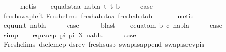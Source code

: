 \begin{isabellebody}
\ \ \ \ \isamarkupfalse%
\ metis\isanewline
{}\isamarkupfalse%
\isanewline
\ \ \isamarkupfalse%
\ {\isacharparenleft}{\kern0pt}equ{\isacharunderscore}{\kern0pt}abst{\isacharunderscore}{\kern0pt}aa\ nabla\ t{}\ t{}\ b{\isacharparenright}{\kern0pt}\isanewline
\ \ \isamarkupfalse%
\ \isamarkupfalse%
\ {\isacharquery}{\kern0pt}case\ \isanewline
\ \ \ \ \isamarkupfalse%
\ fresh{\isacharunderscore}{\kern0pt}swap{\isacharunderscore}{\kern0pt}left\ Fresh{\isacharunderscore}{\kern0pt}elims{\isacharparenleft}{\kern0pt}{}{\isacharparenright}{\kern0pt}\ fresh{\isacharunderscore}{\kern0pt}abst{\isacharunderscore}{\kern0pt}aa\ fresh{\isacharunderscore}{\kern0pt}abst{\isacharunderscore}{\kern0pt}ab\ \isanewline
\ \ \ \ \isamarkupfalse%
\ metis\isanewline
{}\isamarkupfalse%
\isanewline
\ \ \isamarkupfalse%
\ {\isacharparenleft}{\kern0pt}equ{\isacharunderscore}{\kern0pt}unit\ nabla{\isacharparenright}{\kern0pt}\isanewline
\ \ \isamarkupfalse%
\ \isamarkupfalse%
\ {\isacharquery}{\kern0pt}case\isanewline
\ \ \ \ \isamarkupfalse%
\ blast\isanewline
{}\isamarkupfalse%
\isanewline
\ \ \isamarkupfalse%
\ {\isacharparenleft}{\kern0pt}equ{\isacharunderscore}{\kern0pt}atom\ b\ c\ nabla{\isacharparenright}{\kern0pt}\isanewline
\ \ \isamarkupfalse%
\ \isamarkupfalse%
\ {\isacharquery}{\kern0pt}case\ \isanewline
\ \ \ \ \isamarkupfalse%
\ simp\isanewline
{}\isamarkupfalse%
\isanewline
\ \ \isamarkupfalse%
\ {\isacharparenleft}{\kern0pt}equ{\isacharunderscore}{\kern0pt}susp\ pi{}\ pi{}\ X\ nabla{\isacharparenright}{\kern0pt}\isanewline
\ \ \isamarkupfalse%
\ \isamarkupfalse%
\ {\isacharquery}{\kern0pt}case\ \isanewline
\ \ \ \ \isamarkupfalse%
\ Fresh{\isacharunderscore}{\kern0pt}elims{\isacharparenleft}{\kern0pt}{}{\isacharparenright}{\kern0pt}\ ds{\isacharunderscore}{\kern0pt}elem{\isacharunderscore}{\kern0pt}cp\ ds{\isacharunderscore}{\kern0pt}rev\ fresh{\isacharunderscore}{\kern0pt}susp\ swapas{\isacharunderscore}{\kern0pt}append\ swapas{\isacharunderscore}{\kern0pt}rev{\isacharunderscore}{\kern0pt}pi{\isacharunderscore}{\kern0pt}a\isanewline
\ \ \ \ \isamarkupfalse%

\end{isabellebody}

